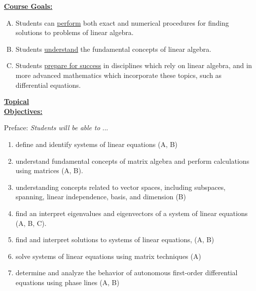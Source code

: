 \documentclass{article}
\theoremstyle{plain}
\theoremstyle{definition}
\theoremstyle{remark}
\begin{document}



\vskip0.1in \noindent
\begin{minipage}[t]{1.2in}
	\underline{\textbf{Course Goals:}}
\end{minipage}
\begin{minipage}[t]{5.3in}
\begin{enumerate}[(A)]
\item Students can \underline{perform} both exact and numerical procedures for finding solutions to problems of linear algebra.
\item Students \underline{understand} the fundamental concepts of linear algebra.
\item Students \underline{prepare for success} in disciplines which rely on linear algebra, and in more advanced mathematics which incorporate these topics, such as differential equations.

\end{enumerate}
\end{minipage}



\vskip0.1in \noindent
\begin{minipage}[t]{1.2in}
	\underline{\textbf{Topical}} \\ \underline{\textbf{Objectives:}}
\end{minipage}
\begin{minipage}[t]{5.3in}
Preface:  \emph{Students will be able to} ...
\begin{enumerate}
\item	define and identify systems of  linear equations (A, B)
\item	understand fundamental concepts of matrix algebra and perform calculations using matrices (A, B). 
\item	understanding concepts related to vector spaces, including subspaces, spanning, linear independence, basis, and dimension (B)
\item	find an interpret eigenvalues and eigenvectors of a system of linear equations (A, B, C).  
\item	find and interpret solutions to systems of linear equations, (A, B)
\item	solve systems of linear equations using matrix techniques (A)
\item	determine and analyze the behavior of autonomous first-order differential equations using phase lines (A, B)

\end{enumerate}
\end{minipage}
\end{document}
